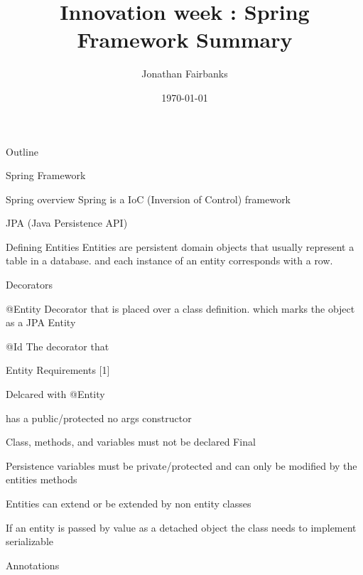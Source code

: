 \documentclass[presentation]{beamer}
\author{Jonathan Fairbanks}
\date{\today}
\title{Innovation week : Spring Framework Summary}
\begin{document}
\maketitle
\begin{frame}{Outline}
\tableofcontents
\end{frame}





\begin{frame}[label={sec:orgacf0020}]{Spring Framework}
\begin{block}{Spring overview}
Spring is a IoC (Inversion of Control) framework
\end{block}
\end{frame}
\begin{frame}[label={sec:org0d53779}]{JPA (Java Persistence API)}
\begin{block}{Defining Entities}
Entities are persistent domain objects that usually represent a table in a database. and each instance of an entity corresponds with a row.
\begin{block}{Decorators}
\begin{block}{@Entity}
Decorator that is placed over a class definition. which marks the object as a JPA Entity
\end{block}
\begin{block}{@Id}
The decorator that
\end{block}
\end{block}
\begin{block}{Entity Requirements [1]}
\begin{block}{Delcared with @Entity}
\end{block}
\begin{block}{has a public/protected no args constructor}
\end{block}
\begin{block}{Class, methods, and variables must not be declared Final}
\end{block}
\begin{block}{Persistence variables must be private/protected and can only be modified by the entities methods}
\end{block}
\begin{block}{Entities can extend or be extended by non entity classes}
\end{block}
\begin{block}{If an entity is passed by value as a detached object the class needs to implement serializable}
\end{block}
\end{block}
\end{block}
\end{frame}
\begin{frame}[label={sec:orgb43e8fe}]{Annotations}
\end{frame}
\end{document}
